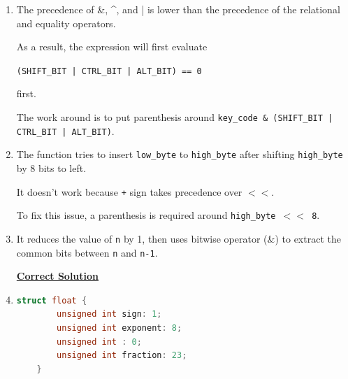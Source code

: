 \documentclass[12pt]{article}
\begin{document}
\begin{enumerate}[1.]
    \item

    The precedence of \&, \^{}, and | is lower than the precedence of the relational
    and equality operators.

    \bigskip

    As a result, the expression will first evaluate

    \bigskip

    \texttt{(SHIFT\_BIT | CTRL\_BIT | ALT\_BIT) == 0}

    \bigskip

    first.

    \bigskip

    The work around is to put parenthesis around \texttt{key\_code \& (SHIFT\_BIT | CTRL\_BIT | ALT\_BIT)}.

    \item

    The function tries to insert \texttt{low\_byte} to \texttt{high\_byte} after
    shifting \texttt{high\_byte} by 8 bits to left.

    \bigskip

    It doesn't work because \texttt{+} sign takes precedence over \texttt{$<<$}.

    \bigskip

    To fix this issue, a parenthesis is required around \texttt{high\_byte $<<$ 8}.

    \bigskip

    \item

    It reduces the value of \texttt{n} by 1, then uses bitwise operator (\&) to
    extract the common bits between \texttt{n} and \texttt{n-1}.

    \bigskip

    \begin{mdframed}
    \underline{\textbf{Correct Solution}}

    \bigskip

    \end{mdframed}

    \item

\begin{lstlisting}[language=c]
    struct float {
        unsigned int sign: 1;
        unsigned int exponent: 8;
        unsigned int : 0;
        unsigned int fraction: 23;
    }
\end{lstlisting}

    \bigskip


\end{enumerate}
\end{document}
